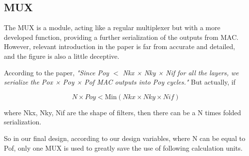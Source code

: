 \subsection{MUX}

The MUX is a module, acting like a regular multiplexer but with a more developed function, providing a further serialization of the outputs from MAC. However, relevant introduction in the paper is far from accurate and detailed, and the figure is also a little deceptive.

According to the paper, \textit{"Since Poy $<$ Nkx × Nky × Nif for all the layers, we serialize the Pox × Poy × Pof MAC outputs into Poy cycles."} But actually, if

\begin{equation*}
    N \times Poy < \mathrm{Min}(Nkx \times Nky \times Nif)
\end{equation*}

where Nkx, Nky, Nif are the shape of filters, then there can be a N times folded serialization.

So in our final design, according to our design variables, where N can be equal to Pof, only one MUX is used to greatly save the use of following calculation units.
